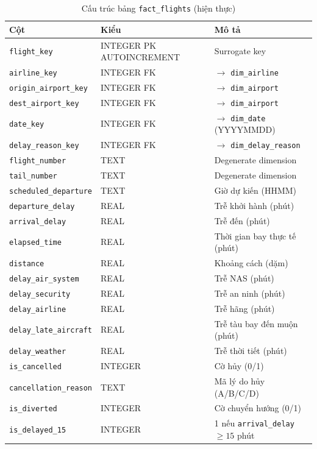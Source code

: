 \begin{table}[H]
\centering
\caption{Cấu trúc bảng \texttt{fact\_flights} (hiện thực)}
\vspace{4pt}
\begin{tabular}{|l|l|l|}
\hline
\textbf{Cột} & \textbf{Kiểu} & \textbf{Mô tả} \\ \hline
\texttt{flight\_key}          & INTEGER PK AUTOINCREMENT & Surrogate key \\ \hline
\texttt{airline\_key}         & INTEGER FK & $\rightarrow$ \texttt{dim\_airline} \\ \hline
\texttt{origin\_airport\_key} & INTEGER FK & $\rightarrow$ \texttt{dim\_airport} \\ \hline
\texttt{dest\_airport\_key}   & INTEGER FK & $\rightarrow$ \texttt{dim\_airport} \\ \hline
\texttt{date\_key}            & INTEGER FK & $\rightarrow$ \texttt{dim\_date} (YYYYMMDD) \\ \hline
\texttt{delay\_reason\_key}   & INTEGER FK & $\rightarrow$ \texttt{dim\_delay\_reason} \\ \hline
\texttt{flight\_number}       & TEXT & Degenerate dimension \\ \hline
\texttt{tail\_number}         & TEXT & Degenerate dimension \\ \hline
\texttt{scheduled\_departure} & TEXT & Giờ dự kiến (HHMM) \\ \hline
\texttt{departure\_delay}     & REAL & Trễ khởi hành (phút) \\ \hline
\texttt{arrival\_delay}       & REAL & Trễ đến (phút) \\ \hline
\texttt{elapsed\_time}        & REAL & Thời gian bay thực tế (phút) \\ \hline
\texttt{distance}             & REAL & Khoảng cách (dặm) \\ \hline
\texttt{delay\_air\_system}   & REAL & Trễ NAS (phút) \\ \hline
\texttt{delay\_security}      & REAL & Trễ an ninh (phút) \\ \hline
\texttt{delay\_airline}       & REAL & Trễ hãng (phút) \\ \hline
\texttt{delay\_late\_aircraft}& REAL & Trễ tàu bay đến muộn (phút) \\ \hline
\texttt{delay\_weather}       & REAL & Trễ thời tiết (phút) \\ \hline
\texttt{is\_cancelled}        & INTEGER & Cờ hủy (0/1) \\ \hline
\texttt{cancellation\_reason} & TEXT & Mã lý do hủy (A/B/C/D) \\ \hline
\texttt{is\_diverted}         & INTEGER & Cờ chuyển hướng (0/1) \\ \hline
\texttt{is\_delayed\_15}      & INTEGER & 1 nếu \texttt{arrival\_delay} $\geq 15$ phút \\ \hline
\end{tabular}
\label{tab:fact_flights_impl}
\end{table}


